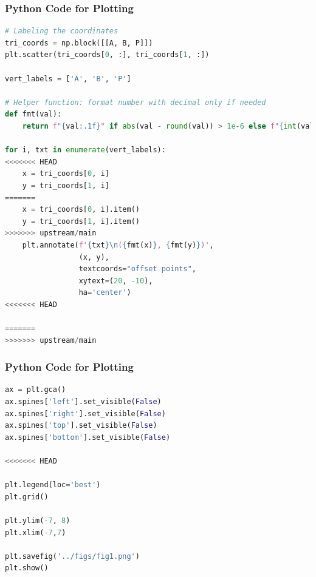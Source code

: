 \documentclass{beamer}
\theoremstyle{remark}
\numberwithin{equation}{section}
\begin{document}
\begin{frame}[fragile]
\frametitle{Python Code for Plotting}
\begin{lstlisting}[language=Python]
# Labeling the coordinates
tri_coords = np.block([[A, B, P]])
plt.scatter(tri_coords[0, :], tri_coords[1, :])

vert_labels = ['A', 'B', 'P']

# Helper function: format number with decimal only if needed
def fmt(val):
    return f"{val:.1f}" if abs(val - round(val)) > 1e-6 else f"{int(val)}"

for i, txt in enumerate(vert_labels):
<<<<<<< HEAD
    x = tri_coords[0, i]
    y = tri_coords[1, i]
=======
    x = tri_coords[0, i].item()
    y = tri_coords[1, i].item()
>>>>>>> upstream/main
    plt.annotate(f'{txt}\n({fmt(x)}, {fmt(y)})',
                 (x, y),
                 textcoords="offset points",
                 xytext=(20, -10),
                 ha='center')
<<<<<<< HEAD

=======
>>>>>>> upstream/main
\end{lstlisting}
\end{frame}

\begin{frame}[fragile]
\frametitle{Python Code for Plotting}
\begin{lstlisting}[language=Python]
ax = plt.gca()
ax.spines['left'].set_visible(False)
ax.spines['right'].set_visible(False)
ax.spines['top'].set_visible(False)
ax.spines['bottom'].set_visible(False)

<<<<<<< HEAD

plt.legend(loc='best')
plt.grid()

plt.ylim(-7, 8)
plt.xlim(-7,7)

plt.savefig('../figs/fig1.png')
plt.show()
\end{lstlisting}
\end{frame}
\end{document}
